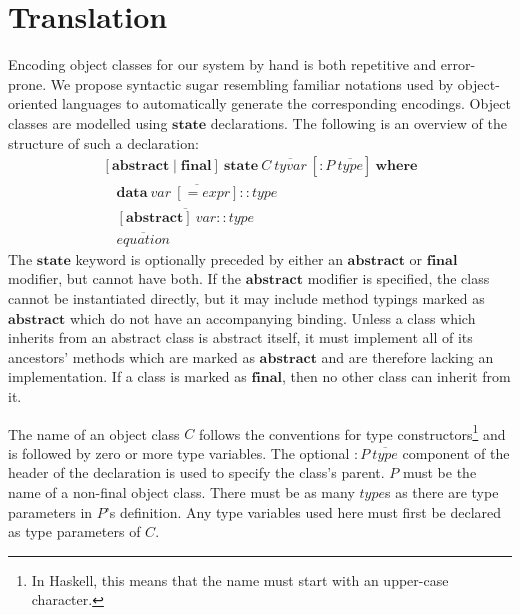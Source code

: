 \section{Translation}
\label{sec:auto}

Encoding object classes for our system by hand is both repetitive and error-prone. We propose syntactic sugar resembling familiar notations used by object-oriented languages to automatically generate the corresponding encodings. Object classes are modelled using $\mathbf{state}$ declarations. The following is an overview of the structure of such a declaration:
\begin{displaymath}
\begin{array}{l}
[\mathbf{abstract} \mid \mathbf{final}]~\mathbf{state}~\mathit{C}~\overline{\mathit{tyvar}}~[: P~\overline{\mathit{type}}]~\mathbf{where} \\
\quad \overline{\mathbf{data}~\mathit{var}~[= \mathit{expr}] :: \mathit{type}} \\
\quad \overline{[\mathbf{abstract}]~\mathit{var} :: \mathit{type}} \\
\quad \overline{\mathit{equation}}
\end{array}
\end{displaymath}
The $\mathbf{state}$ keyword is optionally preceded by either an $\mathbf{abstract}$ or $\mathbf{final}$ modifier, but cannot have both. If the $\mathbf{abstract}$ modifier is specified, the class cannot be instantiated directly, but it may include method typings marked as $\mathbf{abstract}$ which do not have an accompanying binding. Unless a class which inherits from an abstract class is abstract itself, it must implement all of its ancestors' methods which are marked as $\mathbf{abstract}$ and are therefore lacking an implementation. If a class is marked as $\mathbf{final}$, then no other class can inherit from it.

The name of an object class $C$ follows the conventions for type constructors\footnote{In Haskell, this means that the name must start with an upper-case character.} and is followed by zero or more type variables. The optional $: \mathit{P}~\overline{\mathit{type}}$ component of the header of the declaration is used to specify the class's parent. $P$ must be the name of a non-final object class. There must be as many $\mathit{type}$s as there are type parameters in $P$'s definition. Any type variables used here must first be declared as type parameters of $C$.

